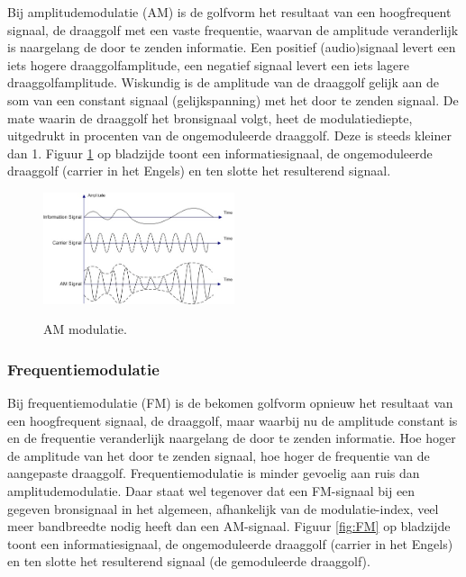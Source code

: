 Bij amplitudemodulatie \cite{kennedy} (AM) is de golfvorm het resultaat van een hoogfrequent signaal, de draaggolf met een vaste frequentie, waarvan de amplitude veranderlijk is naargelang de door te zenden informatie. Een positief (audio)signaal levert een iets hogere draaggolfamplitude, een negatief signaal levert een iets lagere draaggolfamplitude. Wiskundig is de amplitude van de draaggolf gelijk aan de som van een constant signaal (gelijkspanning) met het door te zenden signaal. De mate waarin de draaggolf het bronsignaal volgt, heet de modulatiediepte, uitgedrukt in procenten van de ongemoduleerde draaggolf. Deze is steeds kleiner dan 1. Figuur \ref{fig:AM} op bladzijde \pageref{fig:AM} toont een informatiesignaal, de ongemoduleerde draaggolf (carrier in het Engels) en ten slotte het resulterend signaal.

\begin{figure}[ht]
  \centering
  \includegraphics[width=0.5\textwidth]{voorbeeld_figuren/AM}
  \caption{AM modulatie.} 
  \cite{AM}
  \label{fig:AM}
\end{figure}

\subsubsection{Frequentiemodulatie} 

Bij frequentiemodulatie \cite{kennedy} (FM) is de bekomen golfvorm opnieuw het resultaat van een hoogfrequent signaal, de draaggolf, maar waarbij nu de amplitude constant is en de frequentie veranderlijk naargelang de door te zenden informatie. Hoe hoger de amplitude van het door te zenden signaal, hoe hoger de frequentie van de aangepaste draaggolf. Frequentiemodulatie is minder gevoelig aan ruis dan amplitudemodulatie. Daar staat wel tegenover dat een FM-signaal bij een gegeven bronsignaal in het algemeen, afhankelijk van de modulatie-index, veel meer bandbreedte nodig heeft dan een AM-signaal. Figuur \ref{fig:FM} op bladzijde \pageref{fig:FM} toont een informatiesignaal, de ongemoduleerde draaggolf (carrier in het Engels) en ten slotte het resulterend signaal (de gemoduleerde draaggolf).

